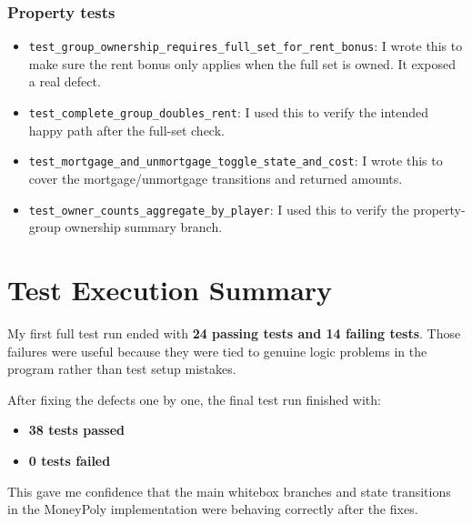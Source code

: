 \documentclass[12pt]{article}
\begin{document}
\subsubsection*{Property tests}
\begin{itemize}
  \item \texttt{test\_group\_ownership\_requires\_full\_set\_for\_rent\_bonus}: I wrote this to make sure the rent bonus only applies when the full set is owned. It exposed a real defect.
  \item \texttt{test\_complete\_group\_doubles\_rent}: I used this to verify the intended happy path after the full-set check.
  \item \texttt{test\_mortgage\_and\_unmortgage\_toggle\_state\_and\_cost}: I wrote this to cover the mortgage/unmortgage transitions and returned amounts.
  \item \texttt{test\_owner\_counts\_aggregate\_by\_player}: I used this to verify the property-group ownership summary branch.
\end{itemize}

\section{Test Execution Summary}
My first full test run ended with \textbf{24 passing tests and 14 failing tests}. Those failures were useful because they were tied to genuine logic problems in the program rather than test setup mistakes.

After fixing the defects one by one, the final test run finished with:

\begin{itemize}
  \item \textbf{38 tests passed}
  \item \textbf{0 tests failed}
\end{itemize}

This gave me confidence that the main whitebox branches and state transitions in the MoneyPoly implementation were behaving correctly after the fixes.
\end{document}

